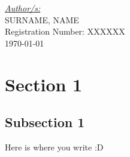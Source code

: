 \documentclass[12pt,a4paper, english]{article}
\begin{document}
\begin{titlepage}
    {\large\underline{\textit{Author/s:}}}\\[0.2cm]
       \textsc{SURNAME, NAME}\\
               Registration Number: XXXXXX\\[0.2cm]

    \vfill\vfill\vfill
    {\large\today}


\end{titlepage}


\newpage
\thispagestyle{empty}
\renewcommand*\contentsname{Index of contents}
\tableofcontents

\newpage
{}

\section{Section 1}
\subsection{Subsection 1}

Here is where you write :D
\end{document}
